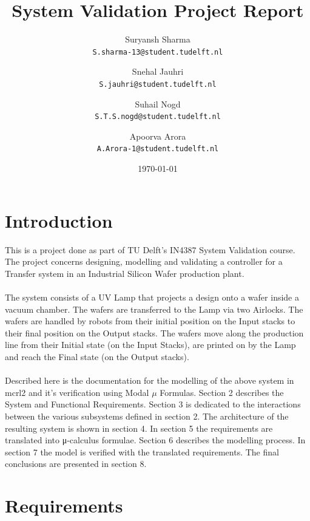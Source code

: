 \documentclass[a4paper,12pt]{article}
\begin{document}
\title{System Validation Project Report}
\author{
	Suryansh Sharma \\ 
	\texttt{S.sharma-13@student.tudelft.nl}
 	\and 
	Snehal Jauhri \\
	\texttt{S.jauhri@student.tudelft.nl} 
	\and
	Suhail Nogd \\
	\texttt{S.T.S.nogd@student.tudelft.nl} 	
	 \and 
	Apoorva Arora\\
	\texttt{A.Arora-1@student.tudelft.nl} 
}

\date {\today}
\maketitle
\newpage
\tableofcontents
 
\newpage
\section{Introduction}
This is a project done as part of TU Delft's IN4387 System Validation course. The project concerns designing, modelling and validating a controller for a Transfer system in an Industrial Silicon Wafer production plant.
\\
\\The system consists of a UV Lamp that projects a design onto a wafer inside a vacuum chamber. The wafers are transferred to the Lamp via two Airlocks. The wafers are handled by robots from their initial position on the Input stacks to their final position on the Output stacks. The wafers move along the production line from their Initial state (on the Input Stacks), are printed on by the Lamp and reach the Final state (on the Output stacks).
\\
\\Described here is the documentation for the modelling of the above system in mcrl2 and it's verification using Modal $\mu$ Formulas. Section 2 describes the System and Functional Requirements. Section 3 is dedicated to the interactions between the various subsystems defined in section 2. The architecture of the resulting system is shown in section 4. In section 5 the requirements are translated into μ-calculus formulae. Section 6 describes the modelling process. In section 7 the model is verified with the translated requirements. The final conclusions are presented in section 8.

\section{Requirements}
\end{document}
